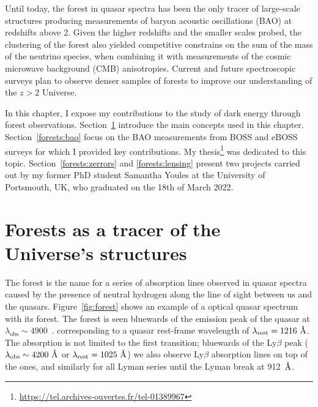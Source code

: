 \chaptertoc{}

\vspace{1em}

Until today, the \lya forest in quasar spectra has been the only 
tracer of large-scale structures producing measurements of 
baryon acoustic oscillations (BAO) at redshifts above 2. 
Given the higher redshifts and the smaller scales probed, 
the clustering of the forest also yielded competitive 
constrains on the sum of the mass of the neutrino species, 
when combining it with measurements of the cosmic microwave background (CMB)
anisotropies. Current and future spectroscopic surveys plan to observe  
denser samples of \lya forests to improve our understanding of the 
$z>2$ Universe.

In this chapter, I expose my contributions to the study of
dark energy through \lya forest observations. 
Section~\ref{forests:intro} introduce the main concepts used in 
this chapter. 
Section~\ref{forests:bao} focus on the BAO measurements from 
BOSS and eBOSS surveys for which I provided key contributions.
My thesis\footnote{\url{https://tel.archives-ouvertes.fr/tel-01389967}} 
was dedicated to this topic.
Section~\ref{forests:zerrors} and \ref{forests:lensing} 
present two projects carried out by my former PhD student  
Samantha Youles at the University of Portsmouth, UK, 
who graduated on the 18th of March 2022. 


\section{Forests as a tracer of the Universe's structures}
\label{forests:intro}

The \lya forest is the name for a series of absorption lines observed in quasar
spectra caused by the presence of neutral hydrogen along the line of 
sight between us and the quasars. 
Figure~\ref{fig:forest} shows an example of a optical quasar spectrum with its \lya forest.
The forest is seen bluewards of the \lya emission peak of the quasar at $\lambda_\text{obs} \sim 4900$~\angstrom.
corresponding to a quasar rest-frame wavelength of $\lambda_\mathrm{rest}=1216~\angstrom$. 
The absorption is not limited to the first transition; bluewards of the 
Ly$\beta$ peak ($\lambda_\text{obs} \sim 4200~\angstrom$ or $\lambda_\mathrm{rest} = 1025~\angstrom$) 
we also observe Ly$\beta$ absorption lines on top of the \lya ones, and similarly for all
Lyman series until the Lyman break at 912~$\angstrom$.

